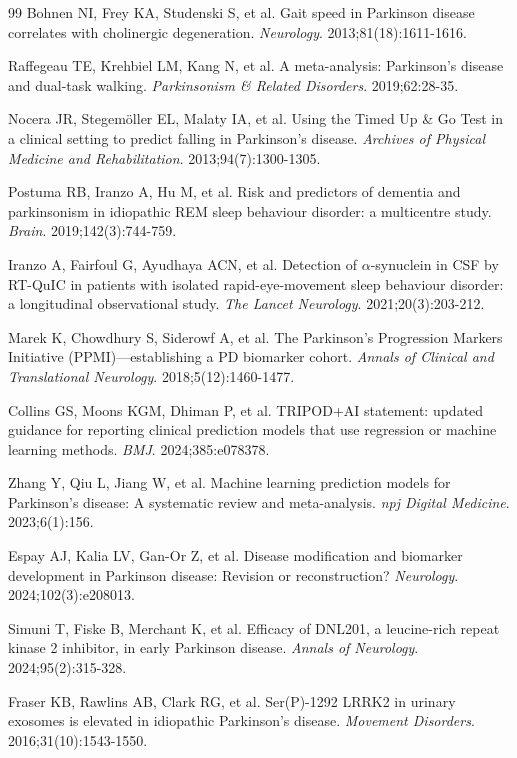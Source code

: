 \documentclass[11pt]{article}
\begin{document}
\begin{thebibliography}{99}
Bohnen NI, Frey KA, Studenski S, et al. Gait speed in Parkinson disease correlates with cholinergic degeneration. \textit{Neurology}. 2013;81(18):1611-1616.

Raffegeau TE, Krehbiel LM, Kang N, et al. A meta-analysis: Parkinson's disease and dual-task walking. \textit{Parkinsonism \& Related Disorders}. 2019;62:28-35.

Nocera JR, Stegemöller EL, Malaty IA, et al. Using the Timed Up \& Go Test in a clinical setting to predict falling in Parkinson's disease. \textit{Archives of Physical Medicine and Rehabilitation}. 2013;94(7):1300-1305.

Postuma RB, Iranzo A, Hu M, et al. Risk and predictors of dementia and parkinsonism in idiopathic REM sleep behaviour disorder: a multicentre study. \textit{Brain}. 2019;142(3):744-759.

Iranzo A, Fairfoul G, Ayudhaya ACN, et al. Detection of $\alpha$-synuclein in CSF by RT-QuIC in patients with isolated rapid-eye-movement sleep behaviour disorder: a longitudinal observational study. \textit{The Lancet Neurology}. 2021;20(3):203-212.

Marek K, Chowdhury S, Siderowf A, et al. The Parkinson's Progression Markers Initiative (PPMI)—establishing a PD biomarker cohort. \textit{Annals of Clinical and Translational Neurology}. 2018;5(12):1460-1477.

Collins GS, Moons KGM, Dhiman P, et al. TRIPOD+AI statement: updated guidance for reporting clinical prediction models that use regression or machine learning methods. \textit{BMJ}. 2024;385:e078378.

Zhang Y, Qiu L, Jiang W, et al. Machine learning prediction models for Parkinson's disease: A systematic review and meta-analysis. \textit{npj Digital Medicine}. 2023;6(1):156.

Espay AJ, Kalia LV, Gan-Or Z, et al. Disease modification and biomarker development in Parkinson disease: Revision or reconstruction? \textit{Neurology}. 2024;102(3):e208013.

Simuni T, Fiske B, Merchant K, et al. Efficacy of DNL201, a leucine-rich repeat kinase 2 inhibitor, in early Parkinson disease. \textit{Annals of Neurology}. 2024;95(2):315-328.

Fraser KB, Rawlins AB, Clark RG, et al. Ser(P)-1292 LRRK2 in urinary exosomes is elevated in idiopathic Parkinson's disease. \textit{Movement Disorders}. 2016;31(10):1543-1550.


\end{thebibliography}
\end{document}
